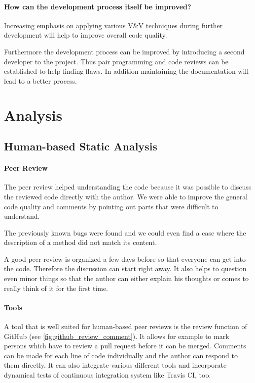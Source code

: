 \documentclass{scrartcl}
\begin{document}
\paragraph{How can the development process itself be improved?}

Increasing emphasis on applying various V\&V techniques during further development will help to improve overall code quality. 

Furthermore the development process can be improved by introducing a second developer to the project. Thus pair programming and code reviews can be established to help finding flaws. In addition maintaining the documentation will lead to a better process.


\section{Analysis}

\subsection{Human-based Static Analysis}

\paragraph{Peer Review}

The peer review helped understanding the code because it was possible to discuss the reviewed code directly with the author.
We were able to improve the general code quality and comments by pointing out parts that were difficult to understand.

The previously known bugs were found and we could even find a case where the description of a method did not match its content.

A good peer review is organized a few days before so that everyone can get into the code. Therefore the discussion can start right away. It also helps to question even minor things so that the author can either explain his thoughts or comes to really think of it for the first time.

\paragraph{Tools}

A tool that is well suited for human-based peer reviews is the review function of GitHub (see \vref{fig:github_review_comment}). It allows for example to mark persons which have to review a pull request before it can be merged. Comments can be made for each line of code individually and the author can respond to them directly. It can also integrate various different tools and incorporate dynamical tests of continuous integration system like Travis CI, too.
\end{document}
